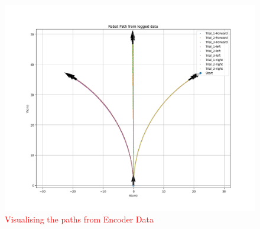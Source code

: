{        \begin{figure}[!ht] 
            \centering \includegraphics[scale=.60]{"images/experiment_2/2.path.png"}
            \caption{\textcolor{red}{Visualising the paths from Encoder Data}}
            \label{fig:path}
        \end{figure}
        
}

